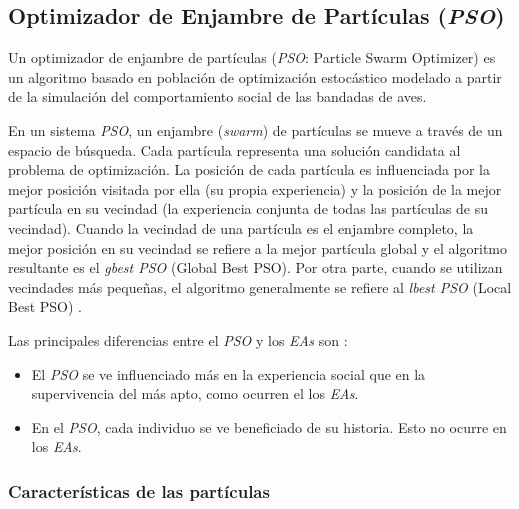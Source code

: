 \subsection{Optimizador de Enjambre de Partículas (\emph{PSO})}
    Un optimizador de enjambre de partículas (\emph{PSO}: Particle Swarm Optimizer)
es un algoritmo basado en población de optimización estocástico modelado a
partir de la simulación del comportamiento social de las bandadas de aves\cite{PSO_1}\cite{PSO_2}.

    En un sistema \emph{PSO}, un enjambre (\emph{swarm}) de partículas se mueve a
través de un espacio de búsqueda. Cada partícula representa una solución
candidata al problema de optimización. La posición de cada partícula es
influenciada por la mejor posición visitada por ella (su propia experiencia) y
la posición de la mejor partícula en su vecindad (la experiencia conjunta de
todas las partículas de su vecindad). Cuando la vecindad de una partícula es
el enjambre completo, la mejor posición en su vecindad se refiere a la mejor
partícula global y el algoritmo resultante es el \emph{gbest PSO} (Global Best
PSO). Por otra parte, cuando se utilizan vecindades más pequeñas, el algoritmo
generalmente se refiere al \emph{lbest PSO} (Local Best PSO) \cite{PSO_0}.

Las principales diferencias entre el \emph{PSO} y los \emph{EAs} son
\cite{PSO_0}:
\begin{itemize}
    \item El \emph{PSO} se ve influenciado más en la experiencia social que en la
supervivencia del más apto, como ocurren el los \emph{EAs}.
    \item En el \emph{PSO}, cada individuo se ve beneficiado de su historia. Esto
no ocurre en los \emph{EAs}.
\end{itemize}

\subsubsection{Características de las partículas}

